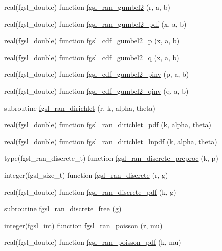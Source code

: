\begin{DoxyCompactItemize}
\item 
real(fgsl\-\_\-double) function \hyperlink{rng_8finc_a8df69840fa11815cfe3c2a5f75e70140}{fgsl\-\_\-ran\-\_\-gumbel2} (r, a, b)
\item 
real(fgsl\-\_\-double) function \hyperlink{rng_8finc_a4064ea0290a475c5d6fc4a09767c6246}{fgsl\-\_\-ran\-\_\-gumbel2\-\_\-pdf} (x, a, b)
\item 
real(fgsl\-\_\-double) function \hyperlink{rng_8finc_aeff0eee0d72c27030164d5c6cb80a06c}{fgsl\-\_\-cdf\-\_\-gumbel2\-\_\-p} (x, a, b)
\item 
real(fgsl\-\_\-double) function \hyperlink{rng_8finc_a3f716068beb8b0ed9023bac7a11077fc}{fgsl\-\_\-cdf\-\_\-gumbel2\-\_\-q} (x, a, b)
\item 
real(fgsl\-\_\-double) function \hyperlink{rng_8finc_aea4916d5cd9092eacf4c3dc7662614c9}{fgsl\-\_\-cdf\-\_\-gumbel2\-\_\-pinv} (p, a, b)
\item 
real(fgsl\-\_\-double) function \hyperlink{rng_8finc_ab0d909e722676fc110f8f44378006c07}{fgsl\-\_\-cdf\-\_\-gumbel2\-\_\-qinv} (q, a, b)
\item 
subroutine \hyperlink{rng_8finc_aed55152f24c3d7788ea10a891af7b28e}{fgsl\-\_\-ran\-\_\-dirichlet} (r, k, alpha, theta)
\item 
real(fgsl\-\_\-double) function \hyperlink{rng_8finc_ad4b62f2563c97a3833e8573cadf3e11c}{fgsl\-\_\-ran\-\_\-dirichlet\-\_\-pdf} (k, alpha, theta)
\item 
real(fgsl\-\_\-double) function \hyperlink{rng_8finc_ad0d73d584086077d1d47e84f1157ce94}{fgsl\-\_\-ran\-\_\-dirichlet\-\_\-lnpdf} (k, alpha, theta)
\item 
type(fgsl\-\_\-ran\-\_\-discrete\-\_\-t) function \hyperlink{rng_8finc_afff9e0980e8ed1185f70b8c9b992acff}{fgsl\-\_\-ran\-\_\-discrete\-\_\-preproc} (k, p)
\item 
integer(fgsl\-\_\-size\-\_\-t) function \hyperlink{rng_8finc_aefc716ef88ffa6cc65fa6282c31dd0f0}{fgsl\-\_\-ran\-\_\-discrete} (r, g)
\item 
real(fgsl\-\_\-double) function \hyperlink{rng_8finc_a156d8a091be2738deec0f2f1b95dfd8a}{fgsl\-\_\-ran\-\_\-discrete\-\_\-pdf} (k, g)
\item 
subroutine \hyperlink{rng_8finc_ac738587037bec690a44a21b02f02e2fc}{fgsl\-\_\-ran\-\_\-discrete\-\_\-free} (g)
\item 
integer(fgsl\-\_\-int) function \hyperlink{rng_8finc_a74186f6416a6812b1e4316ed93dd4219}{fgsl\-\_\-ran\-\_\-poisson} (r, mu)
\item 
real(fgsl\-\_\-double) function \hyperlink{rng_8finc_a8c8223415cae86ff6f8547a1487fdf84}{fgsl\-\_\-ran\-\_\-poisson\-\_\-pdf} (k, mu)

\end{DoxyCompactItemize}

